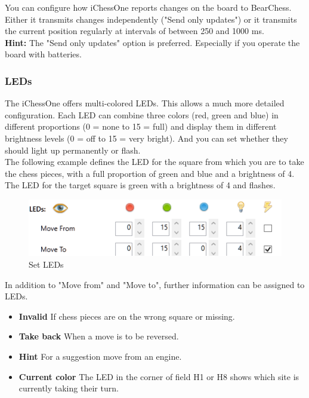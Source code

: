 \documentclass[11pt,a4paper]{article}
\begin{document}
You can configure how iChessOne reports changes on the board to BearChess. Either it transmits changes independently ("Send only updates") or it transmits the current position regularly at intervals of between 250 and 1000 ms.\\
\textbf{Hint:} The "Send only updates" option is preferred. Especially if you operate the board with batteries.\\

\subsubsection{LEDs}

The iChessOne offers multi-colored LEDs. This allows a much more detailed configuration. Each LED can combine three colors ({\color{red}red}, {\color{ForestGreen}green} and {\color{blue}blue}) in different proportions (0 = none to 15 = full) and display them in different brightness levels (0 = off to 15 = very bright).
And you can set whether they should light up permanently or flash.\\
The following example defines the LED for the square from which you are to take the chess pieces, with a full proportion of  {\color{ForestGreen}green} and {\color{blue}blue} and a brightness of 4.
The LED for the target square is {\color{ForestGreen}green} with a brightness of 4 and flashes.

\begin{figure}[H]
	\centering
	\includegraphics[scale=1.0]{iChessOne3.png}
	\caption{Set LEDs }
	\label{fig:iChessOne6}
\end{figure}
In addition to "Move from" and "Move to", further information can be assigned to LEDs.
\begin{itemize}
	\item \textbf{Invalid} If chess pieces are on the wrong square or missing.
	\item \textbf{Take back} When a move is to be reversed.
    \item \textbf{Hint} For a suggestion move from an engine.
    \item \textbf{Current color} The LED in the corner of field H1 or H8 shows which site is currently taking their turn.	       
\end{itemize}
\end{document}
